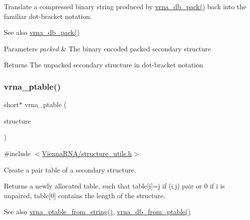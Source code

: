 Translate a compressed binary string produced by \mbox{\hyperlink{group__struct__utils_ga55c4783060a1464f862f858d5599c9e1}{vrna\+\_\+db\+\_\+pack()}} back into the familiar dot-\/bracket notation.

\begin{DoxySeeAlso}{See also}
\mbox{\hyperlink{group__struct__utils_ga55c4783060a1464f862f858d5599c9e1}{vrna\+\_\+db\+\_\+pack()}} 
\end{DoxySeeAlso}

\begin{DoxyParams}{Parameters}
{\em packed} & The binary encoded packed secondary structure \\
\hline
\end{DoxyParams}
\begin{DoxyReturn}{Returns}
The unpacked secondary structure in dot-\/bracket notation 
\end{DoxyReturn}
\mbox{\label{group__struct__utils_gae829fb8bb7f694c12a9c0bbc34c77c60}} 
\subsubsection{\texorpdfstring{vrna\+\_\+ptable()}{vrna\_ptable()}}
{\footnotesize\ttfamily short$\ast$ vrna\+\_\+ptable (\begin{DoxyParamCaption}\item[{const char $\ast$}]{structure }\end{DoxyParamCaption})}



{\ttfamily \#include $<$\mbox{\hyperlink{structure__utils_8h}{Vienna\+R\+N\+A/structure\+\_\+utils.\+h}}$>$}



Create a pair table of a secondary structure. 

Returns a newly allocated table, such that table\mbox{[}i\mbox{]}=j if (i.\+j) pair or 0 if i is unpaired, table\mbox{[}0\mbox{]} contains the length of the structure.

\begin{DoxySeeAlso}{See also}
\mbox{\hyperlink{group__struct__utils_gac76c9ef3de507748fb0416a59323362b}{vrna\+\_\+ptable\+\_\+from\+\_\+string()}}, \mbox{\hyperlink{group__struct__utils_gaf9ecd0d7877fecdbb0292e24f40283d5}{vrna\+\_\+db\+\_\+from\+\_\+ptable()}}
\end{DoxySeeAlso}

